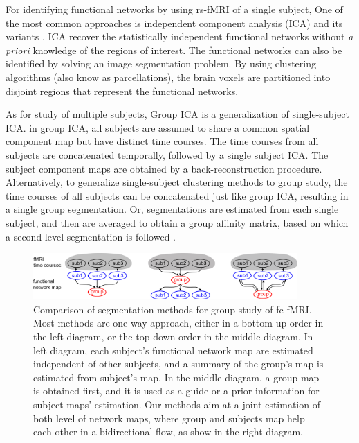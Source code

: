 \documentclass[final,authoryear,5p,twocolumn]{elsarticle}
\begin{document}
For identifying functional networks by using rs-fMRI of a single subject, One of
the most common approaches is independent component analysis (ICA) and its
variants \cite{calhoun2001spatial}. ICA recover the statistically independent
functional networks without \emph{a priori} knowledge of the regions of
interest. The functional networks can also be identified by solving an image
segmentation problem. By using clustering algorithms (also know as
parcellations), the brain voxels are partitioned into disjoint regions that
represent the functional networks.

As for study of multiple subjects, Group ICA \cite{calhoun2001spatial} is a
generalization of single-subject ICA. in group ICA, all subjects are assumed to
share a common spatial component map but have distinct time courses. The time
courses from all subjects are concatenated temporally, followed by a single
subject ICA. The subject component maps are obtained by a back-reconstruction
procedure. Alternatively, to generalize single-subject clustering methods to
group study, the time courses of all subjects can be concatenated just like
group ICA, resulting in a single group segmentation. Or, segmentations are
estimated from each single subject, and then are averaged to obtain a group
affinity matrix, based on which a second level segmentation is followed
\citep{bellec2010multi, van2008normalized}.




\begin{figure}[htb]
  \centering
  \includegraphics[width=0.9\textwidth]{figures/bidirections/bidirections}
  \caption{Comparison of segmentation methods for group study of fc-fMRI. Most
    methods are one-way approach, either in a bottom-up order in the left
    diagram, or the top-down order in the middle diagram. In left diagram, each
    subject's functional network map are estimated independent of other
    subjects, and a summary of the group's map is estimated from subject's
    map. In the middle diagram, a group map is obtained first, and it is used as
    a guide or a prior information for subject maps' estimation. Our methods aim
    at a joint estimation of both level of network maps, where group and
    subjects map help each other in a bidirectional flow, as show in the right
    diagram. }
  \label{fig:bidirections}
\end{figure}
\end{document}
